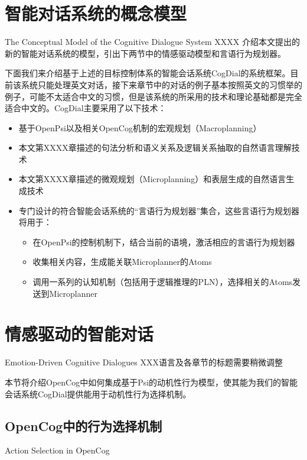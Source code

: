 \section{智能对话系统的概念模型}{The Conceptual Model of the Cognitive Dialogue System}
XXXX  
介绍本文提出的新的智能对话系统的模型，引出下两节中的情感驱动模型和言语行为规划器。


下面我们来介绍基于上述的目标控制体系的智能会话系统CogDial的系统框架。目前该系统只能处理英文对话，接下来章节中的对话的例子基本按照英文的习惯举的例子，可能不太适合中文的习惯，但是该系统的所采用的技术和理论基础都是完全适合中文的。CogDial主要采用了以下技术：

\begin{itemize}
\item  基于OpenPsi以及相关OpenCog机制的宏观规划（Macroplanning）
\item  本文第XXXX章描述的句法分析和语义关系及逻辑关系抽取的自然语言理解技术
\item  本文第XXXX章描述的微观规划（Microplanning）和表层生成的自然语言生成技术
\item  专门设计的符合智能会话系统的“言语行为规划器”集合，这些言语行为规划器将用于：
\begin{itemize}
    \item 在OpenPsi的控制机制下，结合当前的语境，激活相应的言语行为规划器
    \item 收集相关内容，生成能关联Microplanner的Atoms
    \item  调用一系列的认知机制（包括用于逻辑推理的PLN），选择相关的Atoms发送到Microplanner
\end{itemize}
\end{itemize}

\section{情感驱动的智能对话}{Emotion-Driven Cognitive Dialogues}
XXX语言及各章节的标题需要稍微调整

本节将介绍OpenCog中如何集成基于Psi的动机性行为模型，使其能为我们的智能会话系统CogDial提供能用于动机性行为选择机制。


\subsection{OpenCog中的行为选择机制}{ Action Selection in OpenCog}

